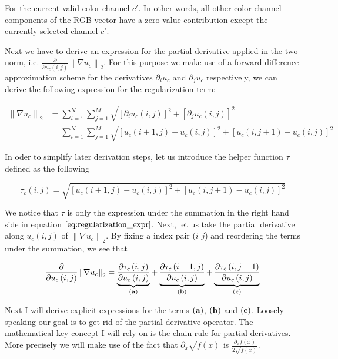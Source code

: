 \documentclass{paper}
\newcommand{\norm}[1]{\left\lVert#1\right\rVert}
\begin{document}
For the current valid color channel $c'$. In other words, all other color channel components of the RGB vector have a zero value contribution except the currently selected channel $c'$.

Next we have to derive an expression for the partial derivative applied in the two norm, i.e. $\frac{\partial}{\partial{u_{c} (i,j)}} \norm{\nabla u_c}_2$. For this purpose we make use of a forward difference approximation scheme for the derivatives $\partial_{i} u_c$ and $\partial_{j} u_c$ respectively, we can derive the following expression for the regularization term:

\begin{align}
	 \norm{\nabla{u_{c}}}_2 
	&= \sum_{i=1}^N \sum_{j=1}^M \sqrt{[\partial_{i} u_c(i,j)]^2 + [\partial_{j} u_c(i,j)]^2} \nonumber \\ 
	&= \sum_{i=1}^N \sum_{j=1}^M \sqrt{\left[ u_{c}\left(i+1, j\right) - u_{c}\left(i,j\right) \right]^2 + \left[ u_{c}\left(i, j+1 \right) - u_{c}\left(i,j\right) \right]^2}
\label{eq:regularization_expr}
\end{align}

In oder to simplify later derivation steps, let us introduce the helper function $\tau$ defined as the following 

\begin{equation}
	 \tau_{c}\left(i,j\right)
	= \sqrt{\left[ u_{c}\left(i+1, j\right) - u_{c}\left(i,j\right) \right]^2 + \left[ u_{c}\left(i, j+1 \right) - u_{c}\left(i,j\right) \right]^2}
\label{eq:tau_function}	
\end{equation}

We notice that $\tau$ is only the expression under the summation in the right hand side in equation $\ref{eq:regularization_expr}$. Next, let us take the partial derivative along $u_{c}(i,j)$ of $\norm{\nabla{u_{c}}}_2$. By fixing a index pair ($i$ $j$) and reordering the terms under the summation, we see that 

\begin{equation}
	\frac{\partial}{\partial u_{c}\left(i,j\right)} \norm{\nabla{u_c}}_2 = \underbrace{\frac{\partial{\tau_{c}\left(i,j\right)}}{\partial u_{c}\left(i,j\right)}}_{\bf{(a)}} + \underbrace{\frac{\partial{\tau_{c}\left(i-1,j\right)}}{\partial u_{c}\left(i,j\right)}}_{\bf{(b)}} + \underbrace{\frac{\partial{\tau_{c}\left(i,j-1\right)}}{\partial u_{c}\left(i,j\right)}}_{\bf{(c)}}
\label{eq:abc_term}
\end{equation}

Next I will derive explicit expressions for the terms $\bf{(a)}$, $\bf{(b)}$ and $\bf{(c)}$. Loosely speaking our goal is to get rid of the partial derivative operator. The mathematical key concept I will rely on is the chain rule for partial derivatives. More precisely we will make use of the fact that $\partial_{x}\sqrt{f(x)}$ is $\frac{\partial_{x} f(x)}{2 \sqrt{f(x)}}$.
\end{document}
